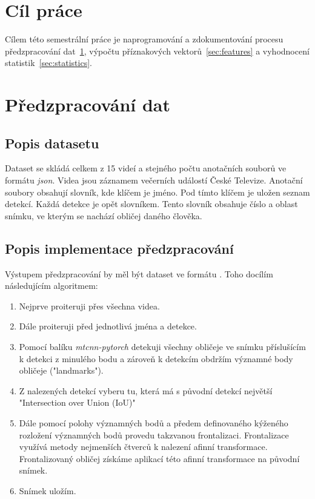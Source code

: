 \documentclass[11pt]{article}
\begin{document}
    \section*{Cíl práce}
    Cílem této semestrální práce je naprogramování a zdokumentování procesu předzpracování dat~\ref{sec:preprocessing},
    výpočtu příznakových vektorů~\ref{sec:features} a vyhodnocení statistik~\ref{sec:statistics}.


    \section{Předzpracování dat}\label{sec:preprocessing}

    \subsection{Popis datasetu}\label{subsec:dataset}
    Dataset se skládá celkem z 15 videí a stejného počtu anotačních souborů ve formátu \textit{json}.
    Videa jsou záznamem večerních událostí České Televize.
    Anotační soubory obsahují slovník, kde klíčem je jméno.
    Pod tímto klíčem je uložen seznam detekcí.
    Každá detekce je opět slovníkem.
    Tento slovník obsahuje číslo a oblast snímku, ve kterým se nachází obličej daného člověka.

    \subsection{Popis implementace předzpracování}
    Výstupem předzpracování by měl být dataset ve formátu .
    Toho docílím následujícím algoritmem:

    \begin{enumerate}
        \item Nejprve proiteruji přes všechna videa.
        \item Dále proiteruji před jednotlivá jména a detekce.
        \item Pomocí balíku \textit{mtcnn-pytorch} detekuji všechny obličeje ve snímku příslušícím k detekci z minulého
        bodu a zároveň k detekcím obdržím významné body obličeje ("landmarks").
        \item Z nalezených detekcí vyberu tu, která má s původní detekcí největší "Intersection over Union (IoU)"
        \item Dále pomocí polohy významných bodů a předem definovaného kýženého rozložení významných bodů provedu
        takzvanou frontalizaci.
        Frontalizace využívá metody nejmenších čtverců k nalezení afinní transformace.
        Frontalizovaný obličej získáme aplikací této afinní transformace na původní snímek.
        \item Snímek uložím.
    \end{enumerate}
\end{document}
